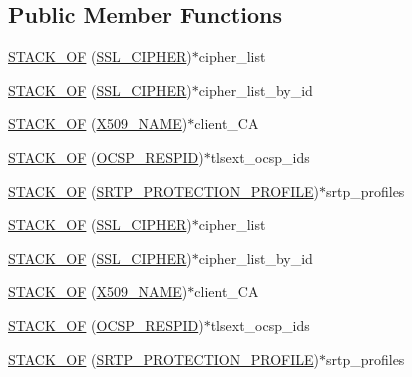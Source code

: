 \subsection*{Public Member Functions}
\begin{DoxyCompactItemize}
\item 
\hyperlink{structssl__st_a377307a717c91a66a906b6fa3c04b74a}{S\+T\+A\+C\+K\+\_\+\+OF} (\hyperlink{include_2openssl_2ssl_8h_a548d7a5d565a9e0e9bd45c49f8c95701}{S\+S\+L\+\_\+\+C\+I\+P\+H\+ER})$\ast$cipher\+\_\+list
\item 
\hyperlink{structssl__st_a9b02b6d0b7d24801c1b7e9a57dfebe5d}{S\+T\+A\+C\+K\+\_\+\+OF} (\hyperlink{include_2openssl_2ssl_8h_a548d7a5d565a9e0e9bd45c49f8c95701}{S\+S\+L\+\_\+\+C\+I\+P\+H\+ER})$\ast$cipher\+\_\+list\+\_\+by\+\_\+id
\item 
\hyperlink{structssl__st_a585acf1ac07e11f87fd62186eddd44bf}{S\+T\+A\+C\+K\+\_\+\+OF} (\hyperlink{crypto_2ossl__typ_8h_a5c5fc036757e87b9bd163d0221696533}{X509\+\_\+\+N\+A\+ME})$\ast$client\+\_\+\+CA
\item 
\hyperlink{structssl__st_a5c163f23805859bdb2fccd23614c1436}{S\+T\+A\+C\+K\+\_\+\+OF} (\hyperlink{crypto_2ossl__typ_8h_a88517618d0bd55dce0e63508cabfc37d}{O\+C\+S\+P\+\_\+\+R\+E\+S\+P\+ID})$\ast$tlsext\+\_\+ocsp\+\_\+ids
\item 
\hyperlink{structssl__st_adea4ce87fc8b96145c1f17a50805b9d7}{S\+T\+A\+C\+K\+\_\+\+OF} (\hyperlink{include_2openssl_2ssl_8h_ad71374b5a3df5292d0722b703841292e}{S\+R\+T\+P\+\_\+\+P\+R\+O\+T\+E\+C\+T\+I\+O\+N\+\_\+\+P\+R\+O\+F\+I\+LE})$\ast$srtp\+\_\+profiles
\item 
\hyperlink{structssl__st_a377307a717c91a66a906b6fa3c04b74a}{S\+T\+A\+C\+K\+\_\+\+OF} (\hyperlink{include_2openssl_2ssl_8h_a548d7a5d565a9e0e9bd45c49f8c95701}{S\+S\+L\+\_\+\+C\+I\+P\+H\+ER})$\ast$cipher\+\_\+list
\item 
\hyperlink{structssl__st_a9b02b6d0b7d24801c1b7e9a57dfebe5d}{S\+T\+A\+C\+K\+\_\+\+OF} (\hyperlink{include_2openssl_2ssl_8h_a548d7a5d565a9e0e9bd45c49f8c95701}{S\+S\+L\+\_\+\+C\+I\+P\+H\+ER})$\ast$cipher\+\_\+list\+\_\+by\+\_\+id
\item 
\hyperlink{structssl__st_a585acf1ac07e11f87fd62186eddd44bf}{S\+T\+A\+C\+K\+\_\+\+OF} (\hyperlink{crypto_2ossl__typ_8h_a5c5fc036757e87b9bd163d0221696533}{X509\+\_\+\+N\+A\+ME})$\ast$client\+\_\+\+CA
\item 
\hyperlink{structssl__st_a5c163f23805859bdb2fccd23614c1436}{S\+T\+A\+C\+K\+\_\+\+OF} (\hyperlink{crypto_2ossl__typ_8h_a88517618d0bd55dce0e63508cabfc37d}{O\+C\+S\+P\+\_\+\+R\+E\+S\+P\+ID})$\ast$tlsext\+\_\+ocsp\+\_\+ids
\item 
\hyperlink{structssl__st_adea4ce87fc8b96145c1f17a50805b9d7}{S\+T\+A\+C\+K\+\_\+\+OF} (\hyperlink{include_2openssl_2ssl_8h_ad71374b5a3df5292d0722b703841292e}{S\+R\+T\+P\+\_\+\+P\+R\+O\+T\+E\+C\+T\+I\+O\+N\+\_\+\+P\+R\+O\+F\+I\+LE})$\ast$srtp\+\_\+profiles
\end{DoxyCompactItemize}
